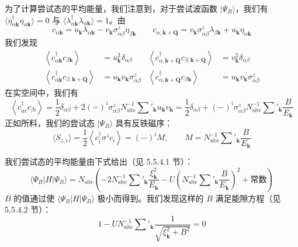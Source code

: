为了计算尝试态的平均能量，我们注意到，对于尝试波函数 $|\Psi_{B}\rangle$，我们有 $\langle\eta^{\dagger}_{\alpha\pmb{k}}\eta_{\alpha\pmb{k}}\rangle=0$ 与 $\langle\lambda^{\dagger}_{\alpha\pmb{k}}\lambda_{\alpha\pmb{k}}\rangle=1$。由
\begin{equation*}
c_{\alpha\pmb{k}}=u_{\pmb{k}}\lambda_{\alpha\pmb{k}}-v_{\pmb{k}}\sigma^{z}_{\alpha\beta}\eta_{\beta\pmb{k}}\qquad c_{\alpha,\pmb{k}+\pmb{Q}}=v_{\pmb{k}}\sigma^{z}_{\alpha\beta}\lambda_{\beta\pmb{k}}+u_{\pmb{k}}\eta_{\alpha\pmb{k}}
\end{equation*}
我们发现
\begin{align*}
\left\langle c^{\dagger}_{\alpha\pmb{k}}c_{\beta\pmb{k}}\right\rangle&=u^{2}_{\pmb{k}}\delta_{\alpha\beta} & \left\langle c^{\dagger}_{\alpha,\pmb{k}+\pmb{Q}}c_{\beta,\pmb{k}+\pmb{Q}}\right\rangle&=v^{2}_{\pmb{k}}\delta_{\alpha\beta}\\
\left\langle c^{\dagger}_{\alpha\pmb{k}}c_{\beta,\pmb{k}+\pmb{Q}}\right\rangle&=u_{\pmb{k}}v_{\pmb{k}}\sigma^{z}_{\alpha\beta} & \left\langle c^{\dagger}_{\alpha,\pmb{k}+\pmb{Q}}c_{\beta\pmb{k}}\right\rangle&=u_{\pmb{k}}v_{\pmb{k}}\sigma^{z}_{\alpha\beta}
\end{align*}
在实空间中，我们有
\begin{equation*}
\left\langle c^{\dagger}_{\alpha i}c_{\beta i}\right\rangle=\frac{1}{2}\delta_{\alpha\beta}+2(-)^{i}\sigma^{z}_{\alpha\beta}N^{-1}_{\mathrm{site}}\sum'_{\pmb{k}}u_{\pmb{k}}v_{\pmb{k}}=\frac{1}{2}\delta_{\alpha\beta}+(-)^{i}\sigma^{z}_{\alpha\beta}N^{-1}_{\mathrm{site}}\sum'_{\pmb{k}}\frac{B}{E_{\pmb{k}}}
\end{equation*}
正如所料，我们的尝试态 $|\Psi_{B}\rangle$ 具有反铁磁序：
\begin{equation*}
\langle S_{z,i}\rangle=\frac{1}{2}\left\langle c^{\dagger}_{i}\sigma^{z}c_{i}\right\rangle=(-)^{i}M,\qquad M=N^{-1}_{\mathrm{site}}\sum'_{\pmb{k}}\frac{B}{E_{\pmb{k}}}
\end{equation*}

我们尝试态的平均能量由下式给出（见 5.5.4.1 节）：
\begin{equation*}
\langle\Psi_{B}|H|\Psi_{B}\rangle=N_{\mathrm{site}}\left(-2N^{-1}_{\mathrm{site}}\sum'_{\pmb{k}}\frac{\xi^{2}_{\pmb{k}}}{E_{\pmb{k}}}-U\left(N^{-1}_{\mathrm{site}}\sum'_{\pmb{k}}\frac{B}{E_{\pmb{k}}}\right)^{2}+\text{常数}\right)
\end{equation*}
$B$ 的值通过使 $\langle\Psi_{B}|H|\Psi_{B}\rangle$ 极小而得到。我们发现这样的 $B$ 满足能隙方程（见 5.5.4.2 节）：
\begin{equation*}
1-UN^{-1}_{\mathrm{site}}\sum'_{\pmb{k}}\frac{1}{\sqrt{\xi^{2}_{\pmb{k}}+B^{2}}}=0\tag{5.5.5}
\end{equation*}


